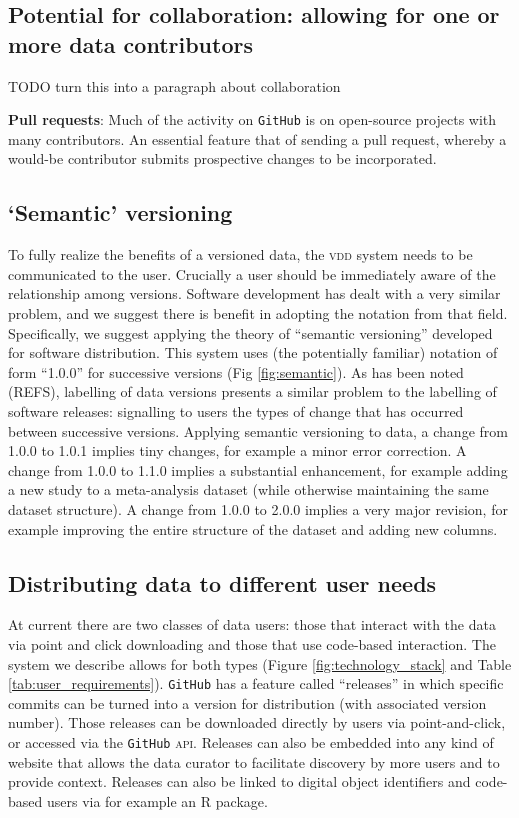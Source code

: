 \documentclass[a4paper,11pt]{article}
\begin{document}
\subsection{Potential for collaboration: allowing for one or more data contributors}

TODO turn this into a paragraph about collaboration

\textbf{Pull requests}: Much of the activity on \texttt{GitHub} is on open-source projects with many contributors. An essential feature that of sending a pull request, whereby a would-be contributor submits prospective changes to be incorporated.

\subsection{`Semantic' versioning}

To fully realize the benefits of a versioned data, the \textsc{vdd} system needs to be communicated to the user.  Crucially a user should be immediately aware of the relationship among versions.  Software development has dealt with a very similar problem, and we suggest there is benefit in adopting the notation from that field.  Specifically, we suggest applying the theory of ``semantic versioning'' developed for software distribution. This system uses (the potentially familiar) notation of form ``1.0.0'' for successive versions (Fig \ref{fig:semantic}). As has been noted (REFS), labelling of data versions presents a similar problem to the labelling of software releases: signalling to users the types of change that has occurred between successive versions. Applying semantic versioning to data, a change from 1.0.0 to 1.0.1 implies tiny changes, for example a minor error correction. A change from 1.0.0 to 1.1.0 implies a substantial enhancement, for example adding a new study to a meta-analysis dataset (while otherwise maintaining the same dataset structure). A change from 1.0.0 to 2.0.0 implies a very major revision, for example improving the entire structure of the dataset and adding new columns.


\subsection{Distributing data to different user needs}

At current there are two classes of data users: those that  interact with the data via point and click downloading and those that use code-based interaction.  The system we describe allows for both types (Figure \ref{fig:technology_stack} and Table \ref{tab:user_requirements}).  \texttt{GitHub} has a feature called ``releases'' in which specific commits can be turned into a version for distribution (with associated version number).  Those releases can be downloaded directly by users via point-and-click, or accessed via the \texttt{GitHub} \textsc{api}. Releases can also be embedded into any kind of website that allows the data curator to facilitate discovery by more users and to provide context.  Releases can also be linked to digital object identifiers and code-based users via for example an \textsc{R} package.
\end{document}
